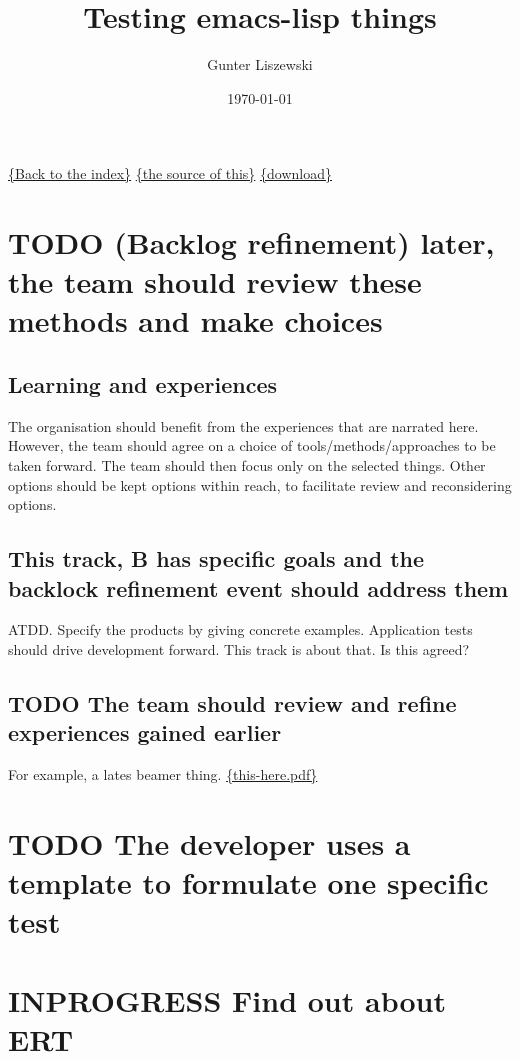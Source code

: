 \documentclass[11pt]{article}
\title{Testing emacs-lisp things}
\author{Gunter Liszewski}
\date{\today}
\begin{document}
\maketitle


\href{file:///home/gunter/sbx/093-agile-org-mode/a/index.org}{\{Back to the index\}} \href{file:///home/gunter/sbx/093-agile-org-mode/b/test-this.org.html}{\{the source of this\}} \href{https://www2.bteco.ltd.uk/t/6/b/test-this.org}{\{download\}}

\section*{\textbf{TODO} (Backlog refinement) later, the team should review these methods and make choices}
\label{sec-1}
\subsection*{Learning and experiences}
\label{sec-1-1}

  The organisation should benefit from the experiences that are narrated here.
  However, the team should agree on a choice of tools/methods/approaches to be
  taken forward. The team should then focus only on the selected things. Other
  options should be kept options within reach, to facilitate review and reconsidering
  options.
\subsection*{This track, B has specific goals and the backlock refinement event should address them}
\label{sec-1-2}

  ATDD. Specify the products by giving concrete examples. Application tests should
  drive development forward. This track is about that. Is this agreed?
\subsection*{\textbf{TODO} The team should review and refine experiences gained earlier}
\label{sec-1-3}

  For example, a lates beamer thing.
  \href{https://the-number.github.io/129/doc/this-here.pdf}{\{this-here.pdf\}}
\section*{\textbf{TODO} The developer uses a template to formulate one specific test}
\label{sec-2}
\section*{\textbf{INPROGRESS} Find out about ERT}
\label{sec-3}
\end{document}

